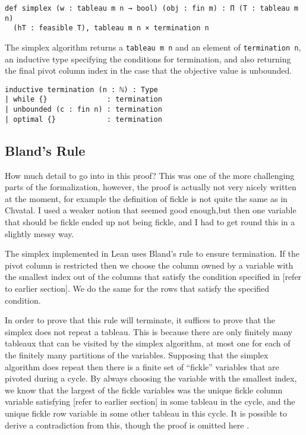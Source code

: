 \documentclass[11pt]{article} %
\begin{document}
\begin{lstlisting}
def simplex (w : tableau m n → bool) (obj : fin m) : Π (T : tableau m n)
  (hT : feasible T), tableau m n × termination n
\end{lstlisting}
The simplex algorithm returns a \lstinline|tableau m n| and an element of \lstinline|termination n|, an inductive type specifying the conditions for termination, and also returning the final pivot column index in the case that the objective value is unbounded.
\begin{lstlisting}
inductive termination (n : ℕ) : Type
| while {}              : termination
| unbounded (c : fin n) : termination
| optimal {}            : termination
\end{lstlisting}

\subsection{Bland's Rule}\label{section:bland}

\color{red}
How much detail to go into in this proof? This was one of the more challenging parts of the formalization, however, the proof is actually not very nicely written at the moment, for example the definition of fickle is not quite the same as in Chvatal. I used a weaker notion that seemed good enough,but then one variable that should be fickle ended up not being fickle, and I had to get round this in a slightly messy way.
\color{black}

The simplex implemented in Lean uses Bland's rule to ensure termination. If the pivot column is restricted then we choose the column owned by a variable with the smallest index out of the columns that satisfy the condition specified in [refer to earlier section]. We do the same for the rows that satisfy the specified condition.

In order to prove that this rule will terminate, it suffices to prove that the simplex does not repeat a tableau. This is because there are only finitely many tableaux that can be visited by the simplex algorithm, at most one for each of the finitely many partitions of the variables. Supposing that the simplex algorithm does repeat then there is a finite set of ``fickle'' variables that are pivoted during a cycle. By always choosing the variable with the smallest index, we know that the largest of the fickle variables was the unique fickle column variable satisfying [refer to earlier section] in some tableau in the cycle, and the unique fickle row variable in some other tableau in this cycle. It is possible to derive a contradiction from this, though the proof is omitted here \cite{Chvatal}.
\end{document}
